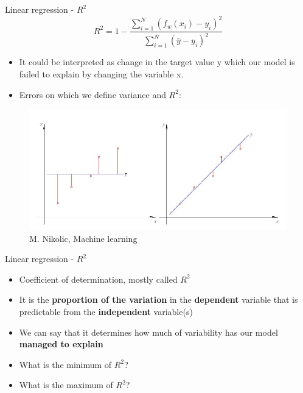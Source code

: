 \documentclass[aspectratio=169]{beamer}
\begin{document}
\begin{frame}{Linear regression - $R^2$}
     $$ R^2 = 1 - \frac{\sum_{i=1}^N(f_w(x_i) - y_i)^2}{\sum_{i=1}^N(\bar{y} - y_i)^2} $$
     \begin{itemize}
         \item It could be interpreted as change in the target value y which our model is failed to explain by changing the variable x. 
         \item Errors on which we define variance and $R^2$:
     \end{itemize}
    \begin{center}
        \begin{figure}
            \includegraphics[scale=0.35]{./images/R.JPG}
            \caption{M. Nikolic, Machine learning}
        \end{figure}
    \end{center}
\end{frame}
\begin{frame}{Linear regression - $R^2$}
    \begin{itemize}
        \item Coefficient of determination, mostly called $R^2$
        \item It is the \textbf{proportion of the variation} in the \textbf{dependent}  variable that is predictable from the \textbf{independent} variable(s)
        \item We can say that it determines how much of variability has our model \textbf{managed to explain}
        \item What is the minimum of $R^2$?
        \item What is the maximum of $R^2$?
    \end{itemize}
\end{frame}
\end{document}
